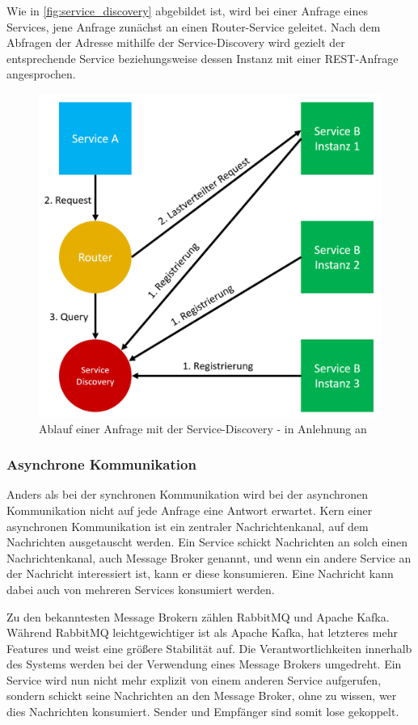 Wie in \autoref{fig:service_discovery} abgebildet ist, wird bei einer Anfrage eines Services, jene Anfrage zunächst an einen Router-Service geleitet. Nach dem Abfragen der Adresse mithilfe der Service-Discovery wird gezielt der entsprechende Service beziehungsweise dessen Instanz mit einer REST-Anfrage angesprochen.

\begin{figure}[H]
    \centering
    \includegraphics[width=0.65\linewidth]{images/service-discovery.png}
    \caption{Ablauf einer Anfrage mit der Service-Discovery - in Anlehnung an \cite{MichaelSchwab.2019}}
    \label{fig:service_discovery}
\end{figure}

\subsubsection*{Asynchrone Kommunikation}

Anders als bei der synchronen Kommunikation wird bei der asynchronen Kommunikation nicht auf jede Anfrage eine Antwort erwartet. Kern einer asynchronen Kommunikation ist ein zentraler Nachrichtenkanal, auf dem Nachrichten ausgetauscht werden. Ein Service schickt Nachrichten an solch einen Nachrichtenkanal, auch Message Broker genannt, und wenn ein andere Service an der Nachricht interessiert ist, kann er diese konsumieren. Eine Nachricht kann dabei auch von mehreren Services konsumiert werden.

Zu den bekanntesten Message Brokern zählen RabbitMQ und Apache Kafka. Während RabbitMQ leichtgewichtiger ist als Apache Kafka, hat letzteres mehr Features und weist eine größere Stabilität auf. Die Verantwortlichkeiten innerhalb des Systems werden bei der Verwendung eines Message Brokers umgedreht. Ein Service wird nun nicht mehr explizit von einem anderen Service aufgerufen, sondern schickt seine Nachrichten an den Message Broker, ohne zu wissen, wer dies Nachrichten konsumiert. Sender und Empfänger sind somit lose gekoppelt.

